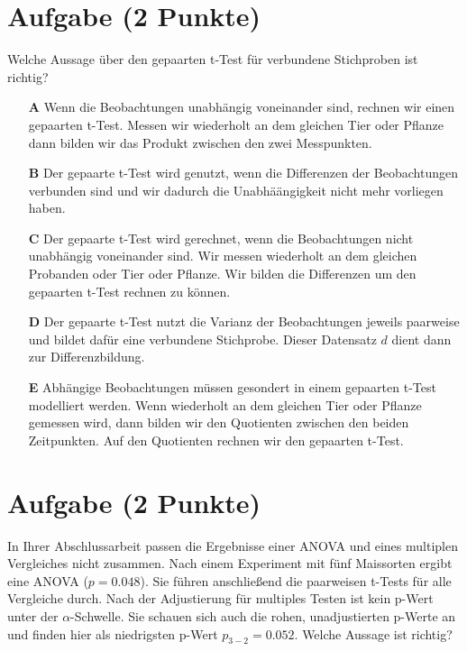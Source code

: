 \documentclass[a4paper, 9pt]{scrartcl}\usepackage[]{graphicx}\usepackage[]{xcolor}
\begin{document}
\section{Aufgabe \hfill (2 Punkte)}




Welche Aussage über den gepaarten t-Test für verbundene Stichproben ist richtig?



\begin{enumerate}
\item [\textbf{A} \msquare] Wenn die Beobachtungen unabhängig voneinander sind, rechnen wir einen gepaarten t-Test. Messen wir wiederholt an dem gleichen Tier oder Pflanze dann bilden wir das Produkt zwischen den zwei Messpunkten.
\item [\textbf{B} \msquare] Der gepaarte t-Test wird genutzt, wenn die Differenzen der Beobachtungen verbunden sind und wir dadurch die Unabhäängigkeit nicht mehr vorliegen haben.
\item [\textbf{C} \msquare] Der gepaarte t-Test wird gerechnet, wenn die Beobachtungen nicht unabhängig voneinander sind. Wir messen wiederholt an dem gleichen Probanden oder Tier oder Pflanze. Wir bilden die Differenzen um den gepaarten t-Test rechnen zu können.
\item [\textbf{D} \msquare] Der gepaarte t-Test nutzt die Varianz der Beobachtungen jeweils paarweise und bildet dafür eine verbundene Stichprobe. Dieser Datensatz $d$ dient dann zur Differenzbildung.
\item [\textbf{E} \msquare] Abhängige Beobachtungen müssen gesondert in einem gepaarten t-Test modelliert werden. Wenn wiederholt an dem gleichen Tier oder Pflanze gemessen wird, dann bilden wir den Quotienten zwischen den beiden Zeitpunkten. Auf den Quotienten rechnen wir den gepaarten t-Test.
\end{enumerate}

\section{Aufgabe \hfill (2 Punkte)}



In Ihrer Abschlussarbeit passen die Ergebnisse einer ANOVA und eines multiplen Vergleiches nicht zusammen. Nach einem Experiment mit fünf Maissorten ergibt eine ANOVA ($p = 0.048$). Sie führen anschließend die paarweisen t-Tests für alle Vergleiche durch. Nach der Adjustierung für multiples Testen ist kein p-Wert unter der $\alpha$-Schwelle. Sie schauen sich auch die rohen, unadjustierten p-Werte an und finden hier als niedrigsten p-Wert $p_{3-2} = 0.052$. Welche Aussage ist richtig?
\end{document}
